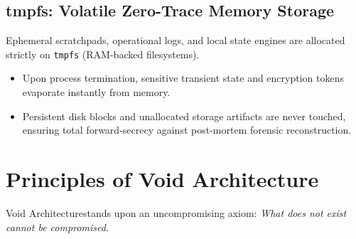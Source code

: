 \documentclass[10pt,a4paper,twocolumn]{article}
\newif\ifja
\begin{document}
\subsection{
\ifja tmpfs: 物理痕跡ゼロの完全揮発性ストレージ \else tmpfs: Volatile Zero-Trace Memory Storage \fi
}
\ifja
プロセスの作業領域、一時ログ、ローカルデータベースは、すべて物理ディスクではなく \texttt{tmpfs}（RAMベースのファイルシステム）上に割り当てる。
\begin{itemize}
    \item 実行終了・プロセス終了に伴い、暗号化キーや中間データはメモリクリアとともに瞬時に消滅する。
    \item 物理ストレージへの残留磁気・未消去ブロックの残存を防ぎ、フォレンジック攻撃に対する完全なエフェメラル性を担保する。
\end{itemize}
\else
Ephemeral scratchpads, operational logs, and local state engines are allocated strictly on \texttt{tmpfs} (RAM-backed filesystems).
\begin{itemize}
    \item Upon process termination, sensitive transient state and encryption tokens evaporate instantly from memory.
    \item Persistent disk blocks and unallocated storage artifacts are never touched, ensuring total forward-secrecy against post-mortem forensic reconstruction.
\end{itemize}
\fi

\section{
\ifja Void Architecture\texttrademark の設計原則 \else Principles of Void Architecture\texttrademark \fi
}
\ifja
Void Architecture\texttrademark は、「存在しないレイヤーには脆弱性も存在しない（What does not exist cannot be compromised）」という絶対命題の上に立つ。
\else
Void Architecture\texttrademark stands upon an uncompromising axiom: \textit{What does not exist cannot be compromised.}
\fi
\end{document}
